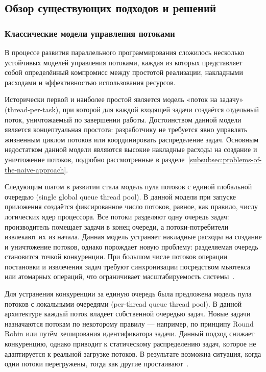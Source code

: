 \subsection{Обзор существующих подходов и решений}
\label{subsec:review-existing-solutions}

\subsubsection{Классические модели управления потоками}

В процессе развития параллельного программирования сложилось несколько
устойчивых моделей управления потоками, каждая из которых представляет
собой определённый компромисс между простотой реализации, накладными
расходами и эффективностью использования ресурсов.

Исторически первой и наиболее простой является модель «поток на
задачу» (thread-per-task), при которой для каждой входящей задачи
создаётся отдельный поток, уничтожаемый по завершении работы.
Достоинством данной модели является концептуальная простота:
разработчику не требуется явно управлять жизненным циклом потоков
или координировать распределение задач. Основным недостатком данной модели являются высокие накладные расходы на создание и уничтожение потоков, подробно рассмотренные в разделе~\ref{subsubsec:problems-of-the-naive-approach}.

Следующим шагом в развитии стала модель пула потоков с единой
глобальной очередью (single global queue thread pool). В данной модели
при запуске приложения создаётся фиксированное число потоков,
равное, как правило, числу логических ядер процессора. Все потоки
разделяют одну очередь задач: производитель помещает задачи в конец
очереди, а потоки-потребители извлекают их из начала. Данная модель
устраняет накладные расходы на создание и уничтожение потоков,
однако порождает новую проблему: разделяемая очередь становится
точкой конкуренции. При большом числе потоков операции постановки
и извлечения задач требуют синхронизации посредством мьютекса или
атомарных операций, что ограничивает масштабируемость
системы~\cite{Williams2019}.

Для устранения конкуренции за единую очередь была предложена модель
пула потоков с локальными очередями (per-thread queue thread pool).
В данной архитектуре каждый поток владеет собственной очередью задач.
Новые задачи назначаются потокам по некоторому правилу --- например,
по принципу Round Robin или путём хеширования идентификатора задачи.
Данный подход снижает конкуренцию, однако приводит к статическому
распределению задач, которое не адаптируется к реальной загрузке
потоков. В результате возможна ситуация, когда одни потоки перегружены,
тогда как другие простаивают~\cite{Herlihy2020}.

